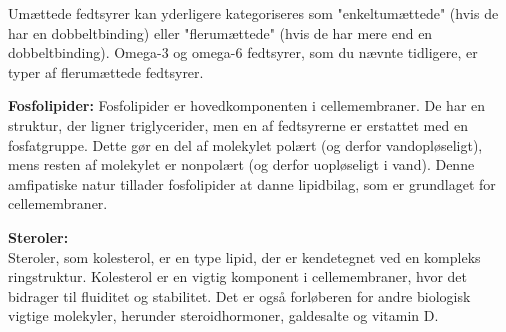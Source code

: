            Umættede fedtsyrer kan yderligere kategoriseres som "enkeltumættede" (hvis de har en dobbeltbinding) eller "flerumættede" (hvis de har mere end en dobbeltbinding). Omega-3 og omega-6 fedtsyrer, som du nævnte tidligere, er typer af flerumættede fedtsyrer.

            \textbf{Fosfolipider:} Fosfolipider er hovedkomponenten i cellemembraner. De har en struktur, der ligner triglycerider, men en af fedtsyrerne er erstattet med en fosfatgruppe. Dette gør en del af molekylet polært (og derfor vandopløseligt), mens resten af molekylet er nonpolært (og derfor uopløseligt i vand). Denne amfipatiske natur tillader fosfolipider at danne lipidbilag, som er grundlaget for cellemembraner.

            \textbf{Steroler:} \\ Steroler, som kolesterol, er en type lipid, der er kendetegnet ved en kompleks ringstruktur. Kolesterol er en vigtig komponent i cellemembraner, hvor det bidrager til fluiditet og stabilitet. Det er også forløberen for andre biologisk vigtige molekyler, herunder steroidhormoner, galdesalte og vitamin D.


            

